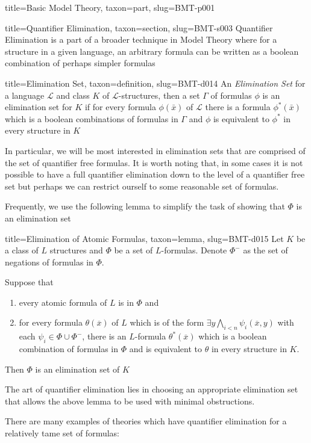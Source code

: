 \documentclass[a4paper]{article}
\begin{document}
\begin{tree}{title={Basic Model Theory}, taxon={part}, slug={BMT-p001}}
\begin{tree}{title={Quantifier Elimination}, taxon={section}, slug={BMT-s003}}
Quantifier Elimination is a part of a broader technique in Model Theory where for a structure in a given language, an arbitrary formula can be written as a boolean combination of perhaps simpler formulas
\begin{tree}{title={Elimination Set}, taxon={definition}, slug={BMT-d014}}
An \emph{Elimination Set} for a language \(\mathcal {L}\) and class \(K\) of \(\mathcal {L}\)-structures, then a set \(\Gamma\) of formulas \(\phi\) is an elimination set for \(K\) if for every formula \(\phi ( \bar {x})\) of \(\mathcal {L}\) there is a formula \(\phi ^*( \bar {x})\) which is a boolean combinations of formulas in \(\Gamma\) and \(\phi\) is equivalent to \(\phi ^*\) in every structure in \(K\)
\end{tree}
\par{In particular, we will be most interested in elimination sets that are comprised of the set of quantifier free formulas. It is worth noting that, in some cases it is not possible to have a full quantifier elimination down to the level of a quantifier free set but perhaps we can restrict ourself to some reasonable set of formulas.}\par{Frequently, we use the following lemma to simplify the task of showing that \(\Phi\) is an elimination set}
\begin{tree}{title={Elimination of Atomic Formulas}, taxon={lemma}, slug={BMT-d015}}
Let \(K\) be a class of \(L\) structures and \(\Phi\) be a set of \(L\)-formulas. Denote \(\Phi ^-\) as the set of negations of formulas in \(\Phi\).\par{Suppose that 
  \begin{enumerate}
\item{every atomic formula of \(L\) is in \(\Phi\) and} 
    \item{for every formula \(\theta ( \overline {x})\) of \(L\) which is of the form \(\exists  y  \bigwedge _{i<n}  \psi _i ( \overline {x},y)\) with each \(\psi _i  \in   \Phi \cup   \Phi ^-\), there is an \(L\)-formula \(\theta ^*( \overline {x})\) which is a boolean combination of formulas in \(\Phi\) and is equivalent to \(\theta\) in every structure in \(K\).}
\end{enumerate}
  Then \(\Phi\) is an elimination set of \(K\)}
\end{tree}
\par{The art of quantifier elimination lies in choosing an appropriate elimination set that allows the above lemma to be used with minimal obstructions. }\par{There are many examples of theories which have quantifier elimination for a relatively tame set of formulas: }
  

\end{tree}
\end{tree}
\end{document}
